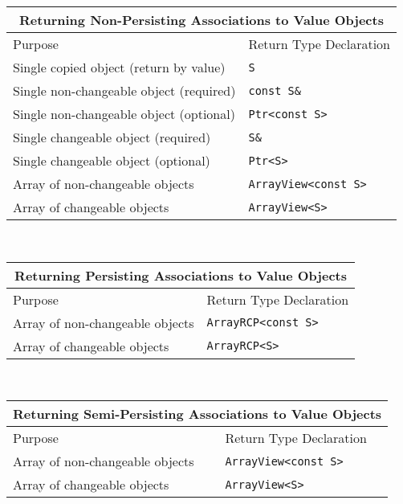\begin{tabular}{|l|l|}
%
\multicolumn{2}{c}{\textbf{Returning Non-Persisting Associations to Value Objects}} \\
%
\hline
Purpose
& Return Type Declaration \\
\hline
\hline
Single copied object (return by value)
& {}\texttt{S} \\
\hline
Single non-changeable object (required)
& {}\texttt{const S\&} \\
\hline
Single non-changeable object (optional)
& {}\texttt{Ptr<const S>} \\
\hline
Single changeable object (required)
& {}\texttt{S\&} \\
\hline
Single changeable object (optional)
& {}\texttt{Ptr<S>} \\
\hline
Array of non-changeable objects
& {}\texttt{ArrayView<const S>} \\
\hline
Array of changeable objects
& {}\texttt{ArrayView<S>} \\
\hline
%
\end{tabular} \\[3ex]
%
\begin{tabular}{|l|l|}
%
\multicolumn{2}{c}{\textbf{Returning Persisting Associations to Value Objects}} \\
%
\hline
Purpose
& Return Type Declaration \\
\hline
\hline
Array of non-changeable objects
& {}\texttt{ArrayRCP<const S>} \\
\hline
Array of changeable objects
& {}\texttt{ArrayRCP<S>} \\
\hline
\end{tabular} \\[3ex]
%
\begin{tabular}{|l|l|}
%
\multicolumn{2}{c}{\textbf{Returning Semi-Persisting Associations to Value Objects}} \\
%
\hline
Purpose
& Return Type Declaration \\
\hline
\hline
Array of non-changeable objects
& {}\texttt{ArrayView<const S>} \\
\hline
Array of changeable objects
& {}\texttt{ArrayView<S>} \\
\hline
\end{tabular}
